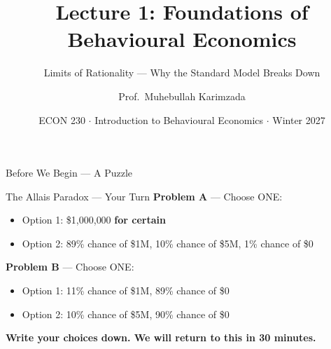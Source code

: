 \documentclass[aspectratio=169]{beamer}
\title{\textbf{Lecture 1: Foundations of Behavioural Economics}}
\subtitle{Limits of Rationality --- Why the Standard Model Breaks Down}
\author{Prof.\ Muhebullah Karimzada}
\institute{School of Economics, University of Northern British Columbia}
\date{ECON 230 $\cdot$ Introduction to Behavioural Economics $\cdot$ Winter 2027}
\begin{document}
\begin{frame}[plain]
  \titlepage
\end{frame}

\begin{frame}{Before We Begin --- A Puzzle}
\begin{alertblock}{The Allais Paradox --- Your Turn}
\textbf{Problem A} --- Choose ONE:
\begin{itemize}
  \item Option 1: \$1{,}000{,}000 \textbf{for certain}
  \item Option 2: 89\% chance of \$1M, 10\% chance of \$5M, 1\% chance of \$0
\end{itemize}
\medskip
\textbf{Problem B} --- Choose ONE:
\begin{itemize}
  \item Option 1: 11\% chance of \$1M, 89\% chance of \$0
  \item Option 2: 10\% chance of \$5M, 90\% chance of \$0
\end{itemize}
\end{alertblock}
\medskip
\centering \textbf{Write your choices down. We will return to this in 30 minutes.}
\end{frame}
\end{document}
